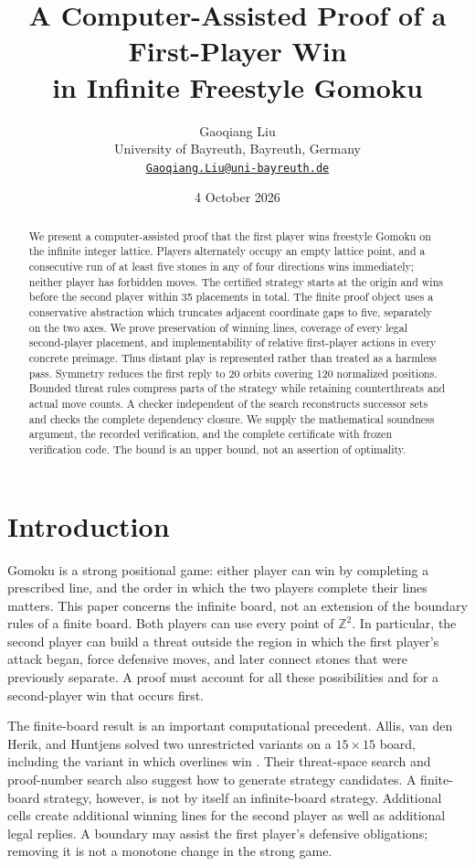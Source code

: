 \documentclass[11pt]{article}
\title{A Computer-Assisted Proof of a First-Player Win\\in Infinite Freestyle Gomoku}
\author{Gaoqiang Liu\\University of Bayreuth, Bayreuth, Germany\\\href{mailto:Gaoqiang.Liu@uni-bayreuth.de}{\texttt{Gaoqiang.Liu@uni-bayreuth.de}}}
\date{4 October 2026}
\theoremstyle{definition}
\theoremstyle{remark}
\newcommand{\Z}{\mathbb Z}
\begin{document}
\maketitle
\begin{abstract}
We present a computer-assisted proof that the first player wins freestyle
Gomoku on the infinite integer lattice. Players alternately occupy an empty
lattice point, and a consecutive run of at least five stones in any of four
directions wins immediately; neither player has forbidden moves. The
certified strategy starts at the origin and wins before the second player
within 35 placements in total. The finite proof object uses a conservative
abstraction which truncates adjacent coordinate gaps to five, separately on
the two axes. We prove preservation of winning lines, coverage of every legal
second-player placement, and implementability of relative first-player
actions in every concrete preimage. Thus distant play is represented rather
than treated as a harmless pass. Symmetry reduces the first reply to 20
orbits covering 120 normalized positions. Bounded threat rules compress parts
of the strategy while retaining counterthreats and actual move counts. A
checker independent of the search reconstructs successor sets and checks the
complete dependency closure. We supply the mathematical soundness argument, the recorded verification,
and the complete certificate with frozen verification code. The
bound is an upper bound, not an assertion of optimality.
\end{abstract}

\section{Introduction}
\label{sec:intro}
Gomoku is a strong positional game: either player can win by completing a
prescribed line, and the order in which the two players complete their lines
matters. This paper concerns the infinite board, not an extension of the
boundary rules of a finite board. Both players can use every point of $\Z^2$.
In particular, the second player can build a threat outside the region in
which the first player's attack began, force defensive moves, and later
connect stones that were previously separate. A proof must account for all
these possibilities and for a second-player win that occurs first.

The finite-board result is an important computational precedent. Allis,
van den Herik, and Huntjens solved two unrestricted variants on a $15\times15$
board, including the variant in which overlines win
\cite{Allis1993,Allis1996}. Their threat-space search and proof-number search
also suggest how to generate strategy candidates. A finite-board strategy,
however, is not by itself an infinite-board strategy. Additional cells create
additional winning lines for the second player as well as additional legal
replies. A boundary may assist the first player's defensive obligations;
removing it is not a monotone change in the strong game.
\end{document}
